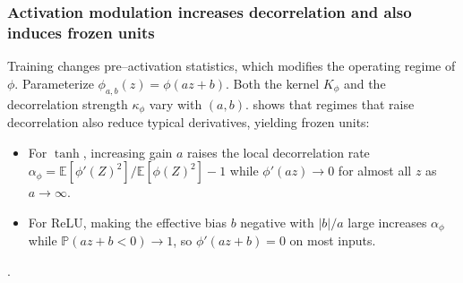 \documentclass{article}
\numberwithin{figure}{section}
\begin{document}
\subsubsection{Activation modulation increases decorrelation and also induces frozen units}
\label{app:numerical_validations_activations}
Training changes pre–activation statistics, which modifies the operating regime of \(\phi\). Parameterize \(\phi_{a,b}(z)=\phi(az+b)\). Both the kernel \(K_\phi\) and the decorrelation strength \(\kappa_\phi\) vary with \((a,b)\).  shows that regimes that raise decorrelation also reduce typical derivatives, yielding frozen units:
\begin{itemize}[leftmargin=1.5em]
\item For \(\tanh\), increasing gain \(a\) raises the local decorrelation rate \(\alpha_\phi=\mathbb{E}[\phi'(Z)^2]/\mathbb{E}[\phi(Z)^2]-1\) while \(\phi'(az)\to 0\) for almost all \(z\) as \(a\to\infty\).
\item For ReLU, making the effective bias \(b\) negative with \(|b|/a\) large increases \(\alpha_\phi\) while \(\mathbb{P}(az+b<0)\to 1\), so \(\phi'(az+b)=0\) on most inputs.
\end{itemize}.

\end{document}
